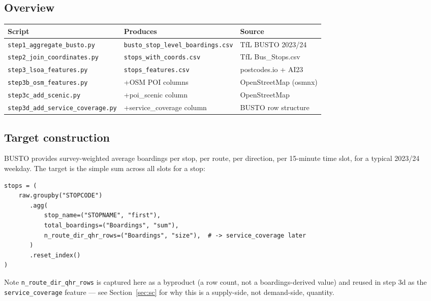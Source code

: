 \documentclass[11pt]{article}
\let\oldsubsection\subsection
\renewcommand{\subsection}[1]{\oldsubsection{\color{sectcolor}#1}}
\begin{document}
\subsection{Overview}
\begin{center}
\begin{tabular}{@{}lll@{}}
\toprule
\textbf{Script} & \textbf{Produces} & \textbf{Source} \\
\midrule
\texttt{step1\_aggregate\_busto.py} & \texttt{busto\_stop\_level\_boardings.csv} & TfL BUSTO 2023/24 \\
\texttt{step2\_join\_coordinates.py} & \texttt{stops\_with\_coords.csv} & TfL Bus\_Stops.csv \\
\texttt{step3\_lsoa\_features.py} & \texttt{stops\_features.csv} & postcodes.io + AI23 \\
\texttt{step3b\_osm\_features.py} & +OSM POI columns & OpenStreetMap (osmnx) \\
\texttt{step3c\_add\_scenic.py} & +poi\_scenic column & OpenStreetMap \\
\texttt{step3d\_add\_service\_coverage.py} & +service\_coverage column & BUSTO row structure \\
\bottomrule
\end{tabular}
\end{center}

\subsection{Target construction}
\label{sec:target}
BUSTO provides survey-weighted average boardings per stop, per route, per direction, per
15-minute time slot, for a typical 2023/24 weekday. The target is the simple sum across all
slots for a stop:
{\small\begin{verbatim}
stops = (
    raw.groupby("STOPCODE")
       .agg(
           stop_name=("STOPNAME", "first"),
           total_boardings=("Boardings", "sum"),
           n_route_dir_qhr_rows=("Boardings", "size"),  # -> service_coverage later
       )
       .reset_index()
)
\end{verbatim}}
Note \texttt{n\_route\_dir\_qhr\_rows} is captured here as a byproduct (a row count, not a
boardings-derived value) and reused in step 3d as the \texttt{service\_coverage} feature ---
see Section~\ref{sec:sc} for why this is a supply-side, not demand-side, quantity.
\end{document}
